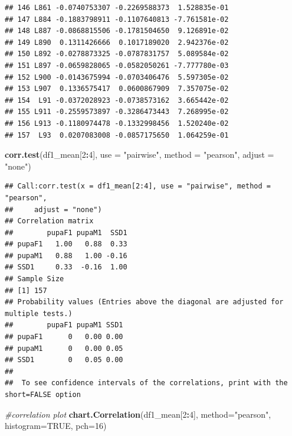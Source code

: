 \documentclass[
]{article}
\newenvironment{Shaded}{\begin{snugshade}}{\end{snugshade}}
\newcommand{\CommentTok}[1]{\textcolor[rgb]{0.56,0.35,0.01}{\textit{#1}}}
\newcommand{\DataTypeTok}[1]{\textcolor[rgb]{0.13,0.29,0.53}{#1}}
\newcommand{\DecValTok}[1]{\textcolor[rgb]{0.00,0.00,0.81}{#1}}
\newcommand{\KeywordTok}[1]{\textcolor[rgb]{0.13,0.29,0.53}{\textbf{#1}}}
\newcommand{\NormalTok}[1]{#1}
\newcommand{\OperatorTok}[1]{\textcolor[rgb]{0.81,0.36,0.00}{\textbf{#1}}}
\newcommand{\OtherTok}[1]{\textcolor[rgb]{0.56,0.35,0.01}{#1}}
\newcommand{\StringTok}[1]{\textcolor[rgb]{0.31,0.60,0.02}{#1}}
\begin{document}
\begin{verbatim}
## 146 L861 -0.0740753307 -0.2269588373  1.528835e-01
## 147 L884 -0.1883798911 -0.1107640813 -7.761581e-02
## 148 L887 -0.0868815506 -0.1781504650  9.126891e-02
## 149 L890  0.1311426666  0.1017189020  2.942376e-02
## 150 L892 -0.0278873325 -0.0787831757  5.089584e-02
## 151 L897 -0.0659828065 -0.0582050261 -7.777780e-03
## 152 L900 -0.0143675994 -0.0703406476  5.597305e-02
## 153 L907  0.1336575417  0.0600867909  7.357075e-02
## 154  L91 -0.0372028923 -0.0738573162  3.665442e-02
## 155 L911 -0.2559573897 -0.3286473443  7.268995e-02
## 156 L913 -0.1180974478 -0.1332998456  1.520240e-02
## 157  L93  0.0207083008 -0.0857175650  1.064259e-01
\end{verbatim}

\begin{Shaded}
\begin{Highlighting}[]
\KeywordTok{corr.test}\NormalTok{(df1_mean[}\DecValTok{2}\OperatorTok{:}\DecValTok{4}\NormalTok{],}
          \DataTypeTok{use    =} \StringTok{"pairwise"}\NormalTok{,}
          \DataTypeTok{method =} \StringTok{"pearson"}\NormalTok{,}
          \DataTypeTok{adjust =} \StringTok{"none"}\NormalTok{)}
\end{Highlighting}
\end{Shaded}

\begin{verbatim}
## Call:corr.test(x = df1_mean[2:4], use = "pairwise", method = "pearson", 
##     adjust = "none")
## Correlation matrix 
##        pupaF1 pupaM1  SSD1
## pupaF1   1.00   0.88  0.33
## pupaM1   0.88   1.00 -0.16
## SSD1     0.33  -0.16  1.00
## Sample Size 
## [1] 157
## Probability values (Entries above the diagonal are adjusted for multiple tests.) 
##        pupaF1 pupaM1 SSD1
## pupaF1      0   0.00 0.00
## pupaM1      0   0.00 0.05
## SSD1        0   0.05 0.00
## 
##  To see confidence intervals of the correlations, print with the short=FALSE option
\end{verbatim}

\begin{Shaded}
\begin{Highlighting}[]
\CommentTok{#correlation plot}
\KeywordTok{chart.Correlation}\NormalTok{(df1_mean[}\DecValTok{2}\OperatorTok{:}\DecValTok{4}\NormalTok{],}
                   \DataTypeTok{method=}\StringTok{"pearson"}\NormalTok{,}
                   \DataTypeTok{histogram=}\OtherTok{TRUE}\NormalTok{,}
                   \DataTypeTok{pch=}\DecValTok{16}\NormalTok{)}
\end{Highlighting}
\end{Shaded}
\end{document}
